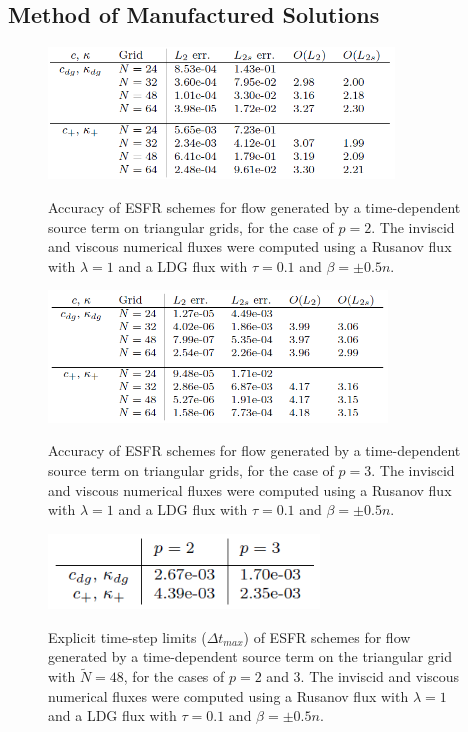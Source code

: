 \graphicspath{{figures_manufactured/}}%


\subsection{Method of Manufactured Solutions}


\begin{figure}
\centering
\includegraphics[height=35mm]{table_917} \\
\caption{Accuracy of ESFR schemes for flow generated by a time-dependent source term on triangular grids, for the case of $p = 2$. The inviscid and viscous numerical fluxes were computed using a Rusanov flux with $\lambda = 1$ and a LDG flux with $\tau = 0.1$ and $\beta = \pm 0.5n$.}
\label{fig:table_917}
\end{figure}

\begin{figure}
\centering
\includegraphics[height=35mm]{table_918} \\
\caption{Accuracy of ESFR schemes for flow generated by a time-dependent source term on triangular grids, for the case of $p = 3$. The inviscid and viscous numerical fluxes were computed using a Rusanov flux with $\lambda = 1$ and a LDG flux with $\tau = 0.1$ and $\beta = \pm 0.5n$.}
\label{fig:table_918}
\end{figure}

\begin{figure}
\centering
\includegraphics[height=20mm]{table_919} \\
\caption{Explicit time-step limits ($\Delta t_{max}$) of ESFR schemes for flow generated by a time-dependent source term on the triangular grid with $\tilde{N} = 48$, for the cases of $p = 2$ and $3$. The inviscid and viscous numerical fluxes were computed using a Rusanov flux with $\lambda = 1$ and a LDG flux with $\tau = 0.1$ and $\beta = \pm 0.5n$.}
\label{fig:table_919}
\end{figure}

